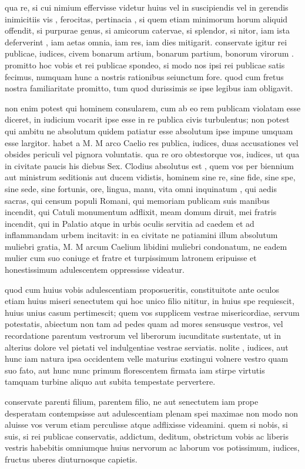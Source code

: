  qua re, si cui nimium effervisse videtur huius vel in suscipiendis vel in gerendis inimicitiis vis , ferocitas, pertinacia , si quem etiam minimorum horum aliquid offendit, si purpurae genus, si amicorum catervae, si splendor, si nitor, iam ista deferverint , iam aetas omnia, iam res, iam dies mitigarit. conservate igitur rei publicae, iudices, civem bonarum artium, bonarum partium, bonorum virorum . promitto hoc vobis et rei publicae spondeo, si modo nos ipsi rei publicae satis fecimus, numquam hunc a nostris rationibus seiunctum fore. quod cum fretus nostra familiaritate promitto, tum quod durissimis se ipse legibus iam obligavit.

 non enim potest qui hominem consularem, cum ab eo rem publicam violatam esse diceret, in iudicium vocarit ipse esse in re publica civis turbulentus; non potest qui ambitu ne absolutum quidem patiatur esse absolutum ipse impune umquam esse largitor. habet a M. M arco Caelio res publica, iudices, duas accusationes vel obsides periculi vel pignora voluntatis. qua re oro obtestorque vos, iudices, ut qua in civitate paucis his diebus Sex. Clodius absolutus est , quem vos per biennium aut ministrum seditionis aut ducem vidistis, hominem sine re, sine fide, sine spe, sine sede, sine fortunis, ore, lingua, manu, vita omni inquinatum , qui aedis sacras, qui censum populi Romani, qui memoriam publicam suis manibus incendit, qui Catuli monumentum adflixit, meam domum diruit, mei fratris incendit, qui in Palatio atque in urbis oculis servitia ad caedem et ad inflammandam urbem incitavit: in ea civitate ne patiamini illum absolutum muliebri gratia, M. M arcum Caelium libidini muliebri condonatum, ne eadem mulier cum suo coniuge et fratre et turpissimum latronem eripuisse et honestissimum adulescentem oppressisse videatur.

 quod cum huius vobis adulescentiam proposueritis, constituitote ante oculos etiam huius miseri senectutem qui hoc unico filio nititur, in huius spe requiescit, huius unius casum pertimescit; quem vos supplicem vestrae misericordiae, servum potestatis, abiectum non tam ad pedes quam ad mores sensusque vestros, vel recordatione parentum vestrorum vel liberorum iucunditate sustentate, ut in alterius dolore vel pietati vel indulgentiae vestrae serviatis. nolite , iudices, aut hunc iam natura ipsa occidentem velle maturius exstingui volnere vestro quam suo fato, aut hunc nunc primum florescentem firmata iam stirpe virtutis tamquam turbine aliquo aut subita tempestate pervertere.

 conservate parenti filium, parentem filio, ne aut senectutem iam prope desperatam contempsisse aut adulescentiam plenam spei maximae non modo non aluisse vos verum etiam perculisse atque adflixisse videamini. quem si nobis, si suis, si rei publicae conservatis, addictum, deditum, obstrictum vobis ac liberis vestris habebitis omniumque huius nervorum ac laborum vos potissimum, iudices, fructus uberes diuturnosque capietis.
